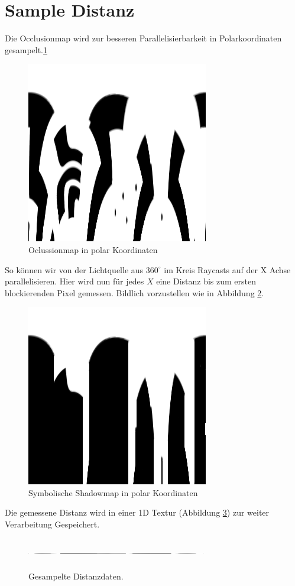 \section{Sample Distanz}
Die Occlusionmap wird zur besseren Parallelisierbarkeit in Polarkoordinaten gesampelt.\ref{o_2}\\
\begin{figure}[h]
	\centering
	\includegraphics{images/oclusion_polar_2.png}
	\caption{Oclussionmap in polar Koordinaten}
	\label{o_2}
\end{figure}
 So können wir von der Lichtquelle aus $360^{\circ}$ im Kreis Raycasts auf der X Achse parallelisieren. Hier wird nun für jedes $X$ eine Distanz bis zum ersten blockierenden Pixel gemessen. Bildlich vorzustellen wie in Abbildung \ref{o_3}.
\begin{figure}[h]
	\centering
	\includegraphics{images/shadow_polar_2.png}
	\caption{Symbolische Shadowmap in polar Koordinaten}
	\label{o_3}
\end{figure}
Die gemessene Distanz wird in einer 1D Textur (Abbildung \ref{o_4}) zur weiter Verarbeitung Gespeichert.
\begin{figure}[h]
	\centering
	\includegraphics[width=0.7\textwidth,height=50px]{images/1DTexture.png}
	\caption{Gesampelte Distanzdaten.}
	\label{o_4}
\end{figure}
